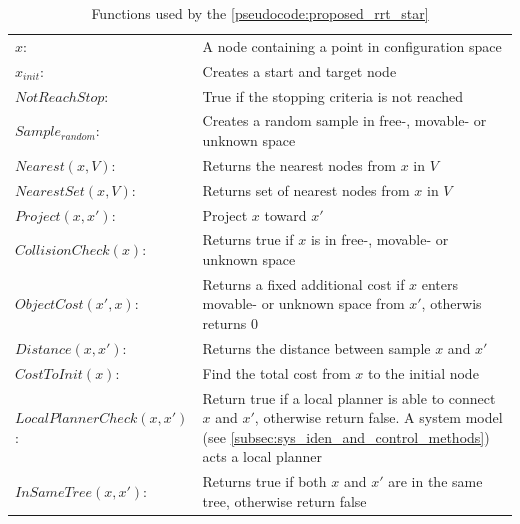 \begin{table}[H]
\centering
\begin{tabular}[t]{l p{10cm}}
$x$:& A node containing a point in configuration space\\
$x_{init}$:& Creates a start and target node\\ 
$NotReachStop$:& True if the stopping criteria is not reached\\ 
$Sample_{random}$:& Creates a random sample in free-, movable- or unknown space\\
$Nearest(x, V)$:& Returns the nearest nodes from $x$ in $V$\\
$NearestSet(x, V)$:& Returns set of nearest nodes from $x$ in $V$\\
$Project(x, x')$:& Project $x$ toward $x'$\\
$CollisionCheck(x)$:& Returns true if $x$ is in free-, movable- or unknown space\\
$ObjectCost(x', x)$:& Returns a fixed additional cost if $x$ enters movable- or unknown space from $x'$, otherwis returns 0\\
$Distance(x, x')$:& Returns the distance between sample $x$ and $x'$\\
$CostToInit(x)$:& Find the total cost from $x$ to the initial node\\
$LocalPlannerCheck(x, x')$:& Return true if a local planner is able to connect $x$ and $x'$, otherwise return false. A system model (see \cref{subsec:sys_iden_and_control_methods}) acts a local planner\\
$InSameTree(x, x')$:& Returns true if both $x$ and $x'$ are in the same tree, otherwise return false\\
\end{tabular}
\caption{Functions used by the \cref{pseudocode:proposed_rrt_star}}
\label{table:functions_for_proposed_rrt_star}
\end{table}

